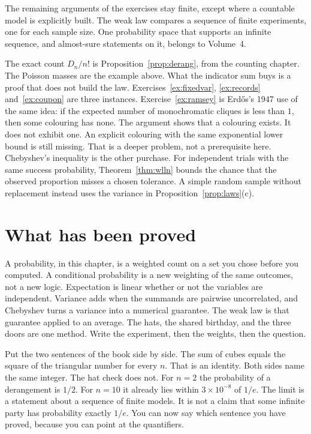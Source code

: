 The remaining arguments of the exercises stay finite, except where a countable model is explicitly built. The weak law compares a sequence of finite experiments, one for each sample size. One probability space that supports an infinite sequence, and almost-sure statements on it, belongs to Volume~4.

\begin{beauty}
The exact count $D_n/n!$ is Proposition~\ref{prop:derang}, from the counting chapter. The Poisson masses are the example above. What the indicator sum buys is a proof that does not build the law. Exercises~\ref{ex:fixedvar}, \ref{ex:records} and~\ref{ex:coupon} are three instances. Exercise~\ref{ex:ramsey} is Erd\H os's 1947 use of the same idea: if the expected number of monochromatic cliques is less than $1$, then some colouring has none. The argument shows that a colouring exists. It does not exhibit one. An explicit colouring with the same exponential lower bound is still missing. That is a deeper problem, not a prerequisite here. Chebyshev's inequality is the other purchase. For independent trials with the same success probability, Theorem~\ref{thm:wlln} bounds the chance that the observed proportion misses a chosen tolerance. A simple random sample without replacement instead uses the variance in Proposition~\ref{prop:laws}(c).
\end{beauty}

\section{What has been proved}

A probability, in this chapter, is a weighted count on a set you chose before you computed. A conditional probability is a new weighting of the same outcomes, not a new logic. Expectation is linear whether or not the variables are independent. Variance adds when the summands are pairwise uncorrelated, and Chebyshev turns a variance into a numerical guarantee. The weak law is that guarantee applied to an average. The hats, the shared birthday, and the three doors are one method. Write the experiment, then the weights, then the question.

Put the two sentences of the book side by side. The sum of cubes equals the square of the triangular number for every $n$. That is an identity. Both sides name the same integer. The hat check does not. For $n=2$ the probability of a derangement is $1/2$. For $n=10$ it already lies within $3\times10^{-8}$ of $1/e$. The limit is a statement about a sequence of finite models. It is not a claim that some infinite party has probability exactly $1/e$. You can now say which sentence you have proved, because you can point at the quantifiers.

